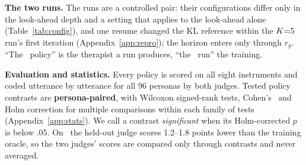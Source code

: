 \textbf{The two runs.} The runs are a controlled pair: their configurations differ only in the
look-ahead depth and a setting that applies to the look-ahead alone (Table~\ref{tab:config}), and
one resume changed the KL reference within the $K{=}5$ run's first iteration
(Appendix~\ref{app:repro}); the horizon enters only through $r_g$. ``The \Kf\ policy'' is the
therapist a run produces, ``the \Kf\ run'' the training.

\textbf{Evaluation and statistics.} Every policy is scored on all eight instruments and coded
utterance by utterance for all 96 personas by both judges. Tested policy contrasts are
\textbf{persona-paired}, with Wilcoxon signed-rank tests, Cohen's \dz\ and Holm correction for
multiple comparisons within each family of tests (Appendix~\ref{app:stats}). We call a contrast
\emph{significant} when its Holm-corrected $p$ is below .05.
On \QQ\ the held-out judge scores 1.2--1.8 points lower than the training oracle, so the two
judges' scores are compared only through contrasts and never averaged.
